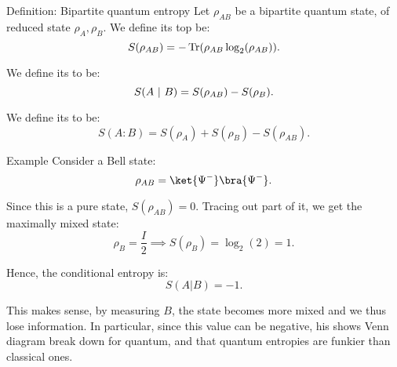 \documentclass[a4paper]{article}
\begin{document}
\begin{parag}{Definition: Bipartite quantum entropy}
    Let $\rho_{AB}$ be a bipartite quantum state, of reduced state $\rho_A, \rho_B$. We define its  top be:
    \[S\left(\rho_{AB}\right) = -\Tr\left(\rho_{AB} \log_2\left(\rho_{AB}\right)\right).\]

    We define its  to be: 
    \[S\left(A \suchthat B\right) = S\left(\rho_{AB}\right)-  S\left(\rho_B\right).\]
    
    We define its  to be:
    \[S\left(A : B\right) = S\left(\rho_A\right) + S\left(\rho_B\right) - S\left(\rho_{AB}\right).\]
\end{parag}

\begin{parag}{Example}
    Consider a Bell state: 
    \[\rho_{AB} = \ket{\Psi^-}\bra{\Psi^-}.\]

    Since this is a pure state, $S\left(\rho_{AB}\right) = 0$. Tracing out part of it, we get the maximally mixed state: 
    \[\rho_B = \frac{I}{2} \implies S\left(\rho_B\right) = \log_2\left(2\right) = 1.\]

    Hence, the conditional entropy is: 
    \[S\left(A | B\right) = -1.\]

    This makes sense, by measuring $B$, the state becomes more mixed and we thus lose information. In particular, since this value can be negative, his shows Venn diagram break down for quantum, and that quantum entropies are funkier than classical ones.
\end{parag}
\end{document}
